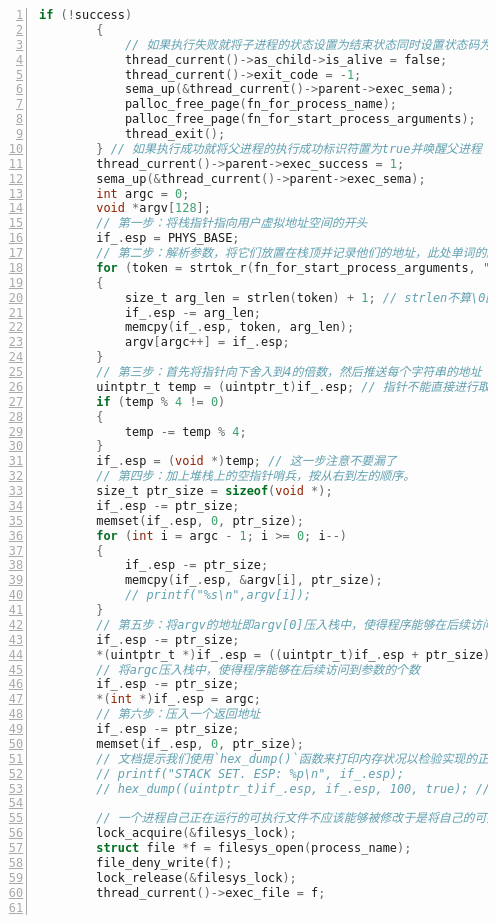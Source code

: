\documentclass{article}
\begin{document}
\begin{lstlisting}[xleftmargin = 4em,xrightmargin = 4em, aboveskip = 1em, numbers = left, language = C,title=修改后的src/userprog/process.c - start\_process]
    	if (!success)
    	{
    		// 如果执行失败就将子进程的状态设置为结束状态同时设置状态码为-1并唤醒父进程
    		thread_current()->as_child->is_alive = false;
    		thread_current()->exit_code = -1;
    		sema_up(&thread_current()->parent->exec_sema);
    		palloc_free_page(fn_for_process_name);
    		palloc_free_page(fn_for_start_process_arguments);
    		thread_exit();
    	} // 如果执行成功就将父进程的执行成功标识符置为true并唤醒父进程
    	thread_current()->parent->exec_success = 1;
    	sema_up(&thread_current()->parent->exec_sema);
    	int argc = 0;
    	void *argv[128];
    	// 第一步：将栈指针指向用户虚拟地址空间的开头
    	if_.esp = PHYS_BASE;
    	// 第二步：解析参数，将它们放置在栈顶并记录他们的地址，此处单词的顺序无关紧要
    	for (token = strtok_r(fn_for_start_process_arguments, " ", &save_ptr); token != NULL; token = strtok_r(NULL, " ", &save_ptr))
    	{
    		size_t arg_len = strlen(token) + 1; // strlen不算\0因此需要+1
    		if_.esp -= arg_len;
    		memcpy(if_.esp, token, arg_len);
    		argv[argc++] = if_.esp;
    	}
    	// 第三步：首先将指针向下舍入到4的倍数，然后推送每个字符串的地址
    	uintptr_t temp = (uintptr_t)if_.esp; // 指针不能直接进行取模运行
    	if (temp % 4 != 0)
    	{
    		temp -= temp % 4;
    	}
    	if_.esp = (void *)temp; // 这一步注意不要漏了
    	// 第四步：加上堆栈上的空指针哨兵，按从右到左的顺序。
    	size_t ptr_size = sizeof(void *);
    	if_.esp -= ptr_size;
    	memset(if_.esp, 0, ptr_size);
    	for (int i = argc - 1; i >= 0; i--)
    	{
    		if_.esp -= ptr_size;
    		memcpy(if_.esp, &argv[i], ptr_size);
    		// printf("%s\n",argv[i]);
    	}
    	// 第五步：将argv的地址即argv[0]压入栈中，使得程序能够在后续访问到上述参数
    	if_.esp -= ptr_size;
    	*(uintptr_t *)if_.esp = ((uintptr_t)if_.esp + ptr_size);
    	// 将argc压入栈中，使得程序能够在后续访问到参数的个数
    	if_.esp -= ptr_size;
    	*(int *)if_.esp = argc;
    	// 第六步：压入一个返回地址
    	if_.esp -= ptr_size;
    	memset(if_.esp, 0, ptr_size);
    	// 文档提示我们使用`hex_dump()`函数来打印内存状况以检验实现的正确性
    	// printf("STACK SET. ESP: %p\n", if_.esp);
    	// hex_dump((uintptr_t)if_.esp, if_.esp, 100, true); // 打印的byte数不用特别准确，随便填大一些
    	
    	// 一个进程自己正在运行的可执行文件不应该能够被修改于是将自己的可执行文件打开并存入该指针来拒绝写入
    	lock_acquire(&filesys_lock);
    	struct file *f = filesys_open(process_name);
    	file_deny_write(f);
    	lock_release(&filesys_lock);
    	thread_current()->exec_file = f;
    	

\end{lstlisting}
\end{document}
